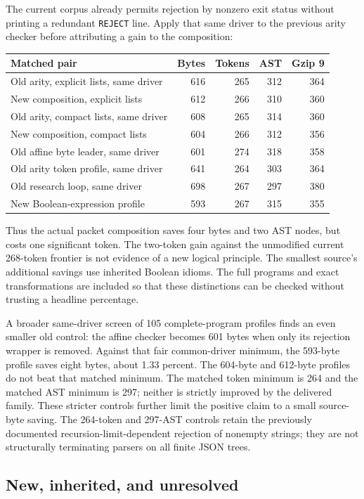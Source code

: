 \documentclass[11pt,letterpaper]{article}
\theoremstyle{definition}\newtheorem{definition}[theorem]{Definition}
\theoremstyle{remark}\newtheorem{remark}[theorem]{Remark}
\begin{document}
The current corpus already permits rejection by nonzero exit status
without printing a redundant \texttt{REJECT} line. Apply that same driver
to the previous arity checker before attributing a gain to the composition:
\begin{center}\small
\begin{tabular}{lrrrr}
\toprule
Matched pair & Bytes & Tokens & AST & Gzip 9\\
\midrule
Old arity, explicit lists, same driver &616&265&312&364\\
New composition, explicit lists &612&266&310&360\\
Old arity, compact lists, same driver &608&265&314&360\\
New composition, compact lists &604&266&312&356\\
Old affine byte leader, same driver &601&274&318&358\\
Old arity token profile, same driver &641&264&303&364\\
Old research loop, same driver &698&267&297&380\\
New Boolean-expression profile &593&267&315&355\\
\bottomrule
\end{tabular}
\end{center}
Thus the actual packet composition saves four bytes and two AST nodes,
but costs one significant token. The two-token gain against the unmodified
current 268-token frontier is not evidence of a new logical principle.
The smallest source's additional savings use inherited Boolean idioms.
The full programs and exact transformations are included so that these
distinctions can be checked without trusting a headline percentage.

A broader same-driver screen of 105 complete-program profiles finds an
even smaller old control: the affine checker becomes 601 bytes when
only its rejection wrapper is removed. Against that fair common-driver
minimum, the 593-byte profile saves eight bytes, about 1.33 percent.
The 604-byte and 612-byte profiles do not beat that matched minimum.
The matched token minimum is 264 and the matched AST minimum is 297;
neither is strictly improved by the delivered family. These stricter
controls further limit the positive claim to a small source-byte saving.
The 264-token and 297-AST controls retain the previously documented
recursion-limit-dependent rejection of nonempty strings; they are not
structurally terminating parsers on all finite JSON trees.

\subsection{New, inherited, and unresolved}
\end{document}
